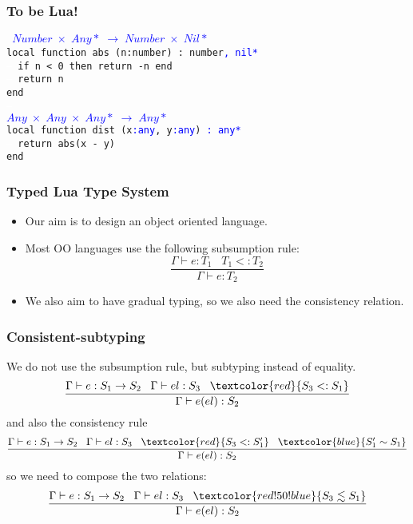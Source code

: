 \documentclass{beamer}
\newcommand{\subtype}{<:}
\newcommand{\env}{\Gamma}
\begin{document}
\begin{frame}
\frametitle{To be Lua!}
{\tt
\textcolor{blue}{$Number \;\times\; {Any*} \;\rightarrow\; Number \;\times\; {Nil*}$}\\
local function abs (n:number) : number\textcolor{blue}{, nil*}\\
\textcolor{white}{--} if n < 0 then return -n end\\
\textcolor{white}{--} return n\\
end\\
\textcolor{white}{--}\\
\textcolor{blue}{$Any \;\times\; Any \;\times\; {Any*} \;\rightarrow\; {Any*}$}\\
local function dist (x\textcolor{blue}{:any}, y\textcolor{blue}{:any}) \textcolor{blue}{: any*}\\
\textcolor{white}{--} return abs(x - y)\\
end\\
}
\end{frame}

\begin{frame}
\frametitle{Typed Lua Type System}
\begin{itemize}
\item Our aim is to design an object oriented language.
\item Most OO languages use the following subsumption rule:
\[
\frac{\env \vdash e:T_{1} \;\;\; T_{1} \subtype T_{2}}
     {\env \vdash e:T_{2}}
\]
\item We also aim to have gradual typing, so we also
need the consistency relation.
\end{itemize}
\end{frame}

\begin{frame}
\frametitle{Consistent-subtyping}
We do not use the subsumption rule, but subtyping
instead of equality.
\[
\frac{\env \vdash e:S_{1} \rightarrow S_{2} \;\;\;
      \env \vdash el:S_{3} \;\;\;
      \textcolor{red}{S_{3} \subtype S_{1}}}
     {\env \vdash e(el):S_{2}}
\]
and also the consistency rule
\[
\frac{\env \vdash e:S_{1} \rightarrow S_{2} \;\;\;
      \env \vdash el:S_{3} \;\;\;
      \textcolor{red}{S_{3} \subtype S_{1}'} \;\;\;
      \textcolor{blue}{S_{1}' \sim S_{1}}}
     {\env \vdash e(el):S_{2}}
\]
so we need to compose the two relations:
\[
\frac{\env \vdash e:S_{1} \rightarrow S_{2} \;\;\;
      \env \vdash el:S_{3} \;\;\;
      \textcolor{red!50!blue}{S_{3} \lesssim S_{1}}}
     {\env \vdash e(el):S_{2}}
\]
\end{frame}
\end{document}
